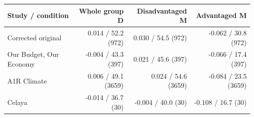 
\begin{tabular}{lrrr}
\toprule
Study / condition & Whole group D & Disadvantaged M & Advantaged M\\
\midrule
Corrected original & 0.014 / 52.2 (972) & 0.030 / 54.5 (972) & -0.062 / 30.8 (972)\\
Our Budget, Our Economy & -0.004 / 43.3 (397) & 0.021 / 45.6 (397) & -0.066 / 17.4 (397)\\
A1R Climate & 0.006 / 49.1 (3659) & 0.024 / 54.6 (3659) & -0.084 / 23.5 (3659)\\
Celaya & -0.014 / 36.7 (30) & -0.004 / 40.0 (30) & -0.108 / 16.7 (30)\\
\bottomrule
\end{tabular}
